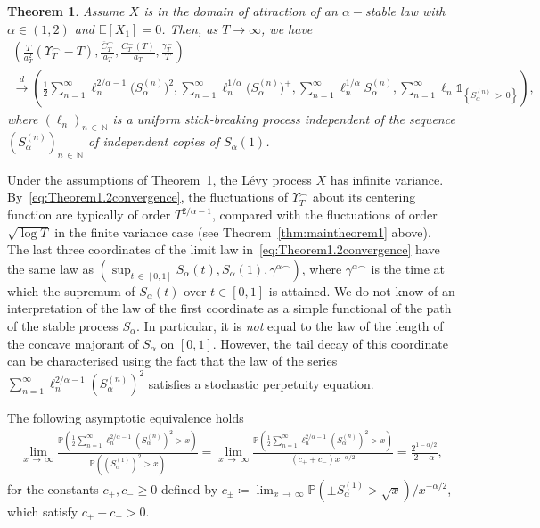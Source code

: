 \documentclass[10pt]{amsart}
\newtheorem{theo}{Theorem}[section]
\theoremstyle{definition}\newtheorem{defi}[theo]{Definition}\newtheorem{rema}[theo]{Remark}\newtheorem{exam}[theo]{Example}\newtheorem{exem}[theo]{Example}\newtheorem{nota}[theo]{Notation}
\newcommand\N{\mathbb{N}}
\newcommand\E{\mathds{E}}
\newcommand\p{\mathds{P}}
\newcommand\1{\mathds{1}}
\newcommand\cid{\xrightarrow{d}}
\newcommand\ov[1]{\overline{#1}}
\begin{document}
\begin{theo}\label{thm:Theorem2}
Assume $X$ is in the domain of attraction of an $\alpha-$stable law with $\alpha\in(1,2)$ and $\E[X_1]=0$. Then, as $T\to\infty$, we have
\begin{equation}\label{eq:Theorem1.2convergence}
\begin{multlined}
\left(\frac{T}{a_T^2}
\left(\Upsilon_T^{\frown}-T \right),
\frac{\ov{C}^\frown_T}{a_T},
\frac{C_T^\frown(T)}{a_T},\frac{\gamma_T^\frown}{T}
\right)\\
\cid\left(\frac{1}{2}\sum_{n=1}^\infty
\ell_n^{2/\alpha-1}\big(S_\alpha^{(n)}\big)^2,
\sum_{n=1}^\infty \ell_n^{1/\alpha}
\big(S_\alpha^{(n)}\big)^+,
\sum_{n=1}^\infty\ell_n^{1/\alpha}S_\alpha^{(n)},
\sum_{n=1}^\infty\ell_n
\1_{\left\{S_\alpha^{(n)}\,>\,0\right\}}
\right),
\end{multlined}
\end{equation}
where $(\ell_n)_{n\,\in\,\N}$ is a uniform stick-breaking process independent of the sequence $(S_\alpha^{(n)})_{n\,\in\,\N}$ of independent copies of $S_\alpha(1)$.
\end{theo}


Under the assumptions of Theorem~\ref{thm:Theorem2}, the Lévy process $X$ has infinite variance. By~\eqref{eq:Theorem1.2convergence}, the fluctuations of $\Upsilon_T^\frown$ about its centering function are typically of order $T^{2/\alpha-1}$, compared with the fluctuations of order $\sqrt{\log T}$ in the finite variance case (see Theorem~\ref{thm:maintheorem1} above). The last three coordinates of the limit law in~\eqref{eq:Theorem1.2convergence} have the same law as $(\sup_{t\,\in\,[0,1]}S_\alpha(t),S_\alpha(1),\gamma^{\alpha\frown})$, where $\gamma^{\alpha\frown}$ is the time at which the supremum of $S_\alpha(t)$ over $t\in[0,1]$ is attained. We do not know of an interpretation of the law of the first coordinate as a simple functional of the path of the stable process $S_\alpha$. In particular, it is \emph{not} equal to the law of the length of the concave majorant of $S_\alpha$ on $[0,1]$. However, the tail decay of this coordinate can be characterised using the fact that the law of the series $\sum_{n=1}^\infty \ell_n^{2/\alpha-1}(S_\alpha^{(n)})^2$ satisfies a stochastic perpetuity equation.

\begin{prop}\label{prop:tailbehaviour}
The following asymptotic equivalence holds
\begin{align*}
\lim_{x\,\to\,\infty}\frac{\p\left(\frac{1}{2}\sum\limits_{n=1}^\infty
\ell_n^{2/\alpha-1}\left(S_\alpha^{(n)}\right)^2>x\right)}{\p\left(\left(S_\alpha^{(1)}\right)^2>x\right)} =\lim_{x\,\to\,\infty}\frac{\p\left(\frac{1}{2}\sum\limits_{n=1}^\infty
\ell_n^{2/\alpha-1}\left(S_\alpha^{(n)}\right)^2>x\right)}{\left(c_+ + c_-\right)x^{-\alpha/2}} =\frac{2^{1-\alpha/2}}{2-\alpha},
\end{align*}
for the constants $c_+,c_-\ge 0$ defined by $c_\pm\coloneqq \lim_{x\,\to\,\infty}\p(\pm S_\alpha^{(1)}>\sqrt{x})/x^{-\alpha/2}$, which satisfy $c_++c_->0$.
\end{prop}
\end{document}
